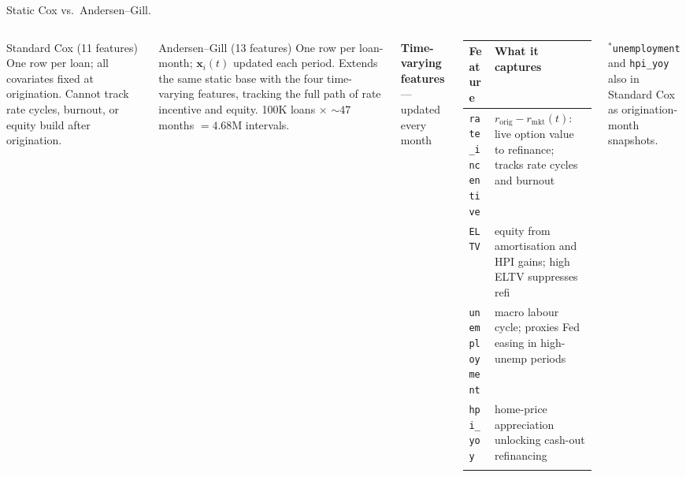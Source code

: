\documentclass[10pt,aspectratio=169]{beamer}
\begin{document}
\begin{frame}{Static Cox vs.\ Andersen--Gill.}
    \begin{columns}[T,onlytextwidth]

        \begin{block}{Standard Cox (11 features)}
        \small\vspace{2pt}
        One row per loan; all covariates fixed at origination.
        Cannot track rate cycles, burnout, or equity build
        after origination.
        \vspace{2pt}
        \end{block}

        \vspace{0.5em}

        \begin{block}{Andersen--Gill (13 features)}
        \small\vspace{2pt}
        One row per loan-month; $\mathbf{x}_i(t)$ updated each period.
        Extends the same static base with the four time-varying
        features, tracking the full path of rate incentive and
        equity. 100K loans $\times$ ${\sim}47$ months $= 4.68$M intervals.
        \vspace{2pt}
        \end{block}

        \vspace{0.2em}
        \small\textbf{Time-varying features} --- updated every month
        \vspace{0.4em}

        \begin{tabular}{@{}p{2.5cm}p{4.1cm}@{}}
            \toprule
            \textbf{Feature} & \textbf{What it captures} \\
            \midrule
            \addlinespace[2pt]
            \texttt{rate\_incentive} & $r_{\text{orig}}{-}r_{\text{mkt}}(t)$: live option value to refinance; tracks rate cycles and burnout \\
            \addlinespace[4pt]
            \texttt{ELTV}            & equity from amortisation and HPI gains; high ELTV suppresses refi \\
            \addlinespace[4pt]
            \texttt{unemployment}    & macro labour cycle; proxies Fed easing in high-unemp periods \\
            \addlinespace[4pt]
            \texttt{hpi\_yoy}        & home-price appreciation unlocking cash-out refinancing \\
            \addlinespace[2pt]
            \bottomrule
        \end{tabular}

        \vspace{0.5em}
        \footnotesize $^*$\texttt{unemployment} and \texttt{hpi\_yoy} also in Standard Cox as origination-month snapshots.

    \end{columns}
\end{frame}
\end{document}
